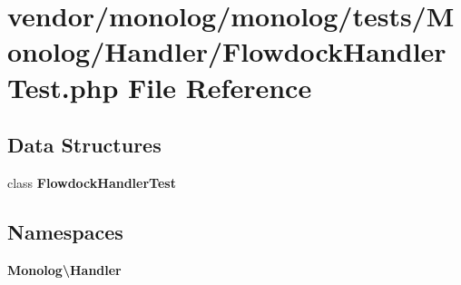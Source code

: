 \section{vendor/monolog/monolog/tests/\+Monolog/\+Handler/\+Flowdock\+Handler\+Test.php File Reference}
\label{_flowdock_handler_test_8php}
\subsection*{Data Structures}
\begin{DoxyCompactItemize}
\item 
class {\bf Flowdock\+Handler\+Test}
\end{DoxyCompactItemize}
\subsection*{Namespaces}
\begin{DoxyCompactItemize}
\item 
 {\bf Monolog\textbackslash{}\+Handler}
\end{DoxyCompactItemize}
